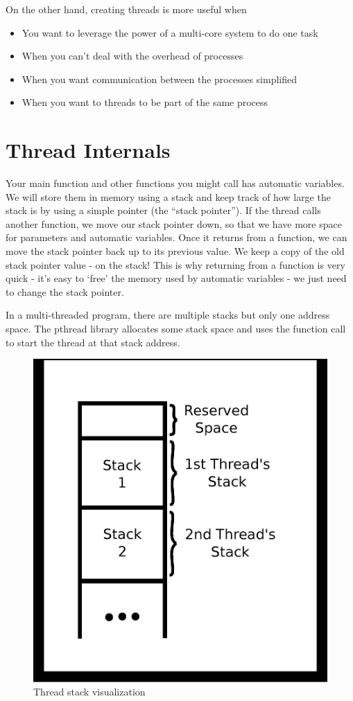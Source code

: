 On the other hand, creating threads is more useful when
\begin{itemize}
\item You want to leverage the power of a multi-core system to do one task
\item When you can't deal with the overhead of processes
\item When you want communication between the processes simplified
\item When you want to threads to be part of the same process
\end{itemize}

\section{Thread Internals}

Your main function and other functions you might call has automatic variables.
We will store them in memory using a stack and keep track of how large the stack is by using a simple pointer (the ``stack pointer'').
If the thread calls another function, we move our stack pointer down, so that we have more space for parameters and automatic variables.
Once it returns from a function, we can move the stack pointer back up to its previous value.
We keep a copy of the old stack pointer value - on the stack!
This is why returning from a function is very quick - it's easy to `free' the memory used by automatic variables - we just need to change the stack pointer.

In a multi-threaded program, there are multiple stacks but only one address space. The pthread library allocates some stack space and uses the  function call to start the thread at that stack address.

\begin{figure}[H]
\centering
\includegraphics[width=.5\textwidth]{threads/drawings/thread_stack.eps}
\caption{Thread stack visualization}
\end{figure}


